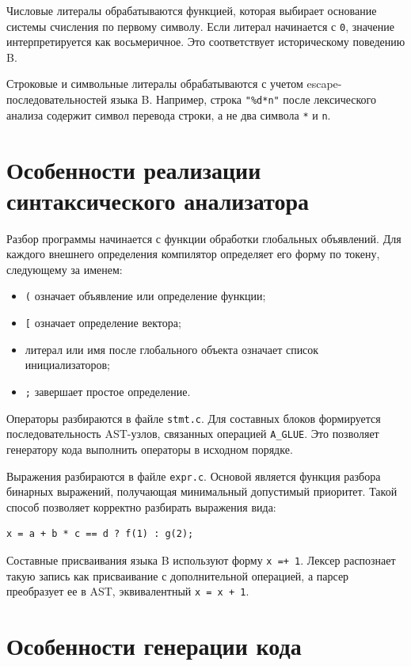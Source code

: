 Числовые литералы обрабатываются функцией, которая выбирает основание системы счисления по первому символу. Если литерал начинается с \texttt{0}, значение интерпретируется как восьмеричное. Это соответствует историческому поведению B.

Строковые и символьные литералы обрабатываются с учетом escape-последовательностей языка B. Например, строка \texttt{"\%d*n"} после лексического анализа содержит символ перевода строки, а не два символа \texttt{*} и \texttt{n}.

\section{Особенности реализации синтаксического анализатора}

Разбор программы начинается с функции обработки глобальных объявлений. Для каждого внешнего определения компилятор определяет его форму по токену, следующему за именем:

\begin{itemize}
  \item \texttt{(} означает объявление или определение функции;
  \item \texttt{[} означает определение вектора;
  \item литерал или имя после глобального объекта означает список инициализаторов;
  \item \texttt{;} завершает простое определение.
\end{itemize}

Операторы разбираются в файле \texttt{stmt.c}. Для составных блоков формируется последовательность AST-узлов, связанных операцией \texttt{A\_GLUE}. Это позволяет генератору кода выполнить операторы в исходном порядке.

Выражения разбираются в файле \texttt{expr.c}. Основой является функция разбора бинарных выражений, получающая минимальный допустимый приоритет. Такой способ позволяет корректно разбирать выражения вида:

\begin{verbatim}
x = a + b * c == d ? f(1) : g(2);
\end{verbatim}

Составные присваивания языка B используют форму \texttt{x =+ 1}. Лексер распознает такую запись как присваивание с дополнительной операцией, а парсер преобразует ее в AST, эквивалентный \texttt{x = x + 1}.

\section{Особенности генерации кода}

